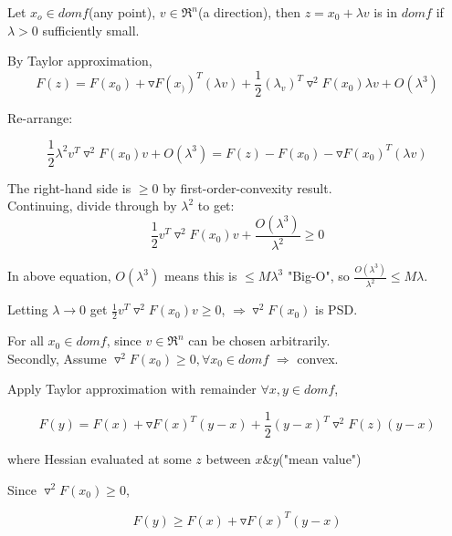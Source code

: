 Let $x_o \in domf$(any point), $v\in \Re^n$(a direction), then $z = x_0 + \lambda v$ is in $domf$ if $\lambda > 0$ sufficiently small. 

By Taylor approximation, 
\begin{equation*}
F(z) = F(x_0) + \triangledown F(x_))^T(\lambda v) + \frac{1}{2}(\lambda_v)^T\triangledown^2F(x_0)\lambda v + O(\lambda^3)
\end{equation*}

Re-arrange:

\begin{equation*}
\frac{1}{2}\lambda^2v^T\triangledown^2F(x_0)v+O(\lambda^3) =       F(z) - F(x_0) - \triangledown F(x_0)^T(\lambda v)
\end{equation*}

The right-hand side is $\geq 0$ by first-order-convexity result.\\ 





Continuing, divide through by $\lambda^2$ to get:
\begin{equation*}
\frac{1}{2}v^T\triangledown^2F(x_0)v + \frac{O(\lambda^3)}{\lambda^2} \geq 0
\end{equation*}

In above equation, $O(\lambda^3)$ means this is $\leq M\lambda^3$ "Big-O", so $\frac{O(\lambda^3)}{\lambda^2} \leq M\lambda$.

Letting $\lambda\rightarrow 0$ get $\frac{1}{2}v^T\triangledown^2F(x_0)v\geq 0$, $\Rightarrow \triangledown^2F(x_0)$ is PSD. 

For all $x_0 \in domf$, since $v\in \Re^n$ can be chosen arbitrarily. \\

Secondly, Assume $\triangledown^2F(x_0)\geq 0, \forall x_0\in domf$ $\Rightarrow$ convex.

Apply Taylor approximation with remainder $\forall x,y\in domf$, 

\begin{equation*}
F(y) =F(x) + \triangledown F(x)^T(y-x) + \frac{1}{2}(y-x)^T\triangledown^2F(z)(y-x)
\end{equation*}

where Hessian evaluated at some $z$ between $x\& y$("mean value")

Since $\triangledown^2F(x_0)\geq 0$,

\begin{equation*}
F(y) \geq F(x) + \triangledown F(x)^T (y-x)
\end{equation*}

